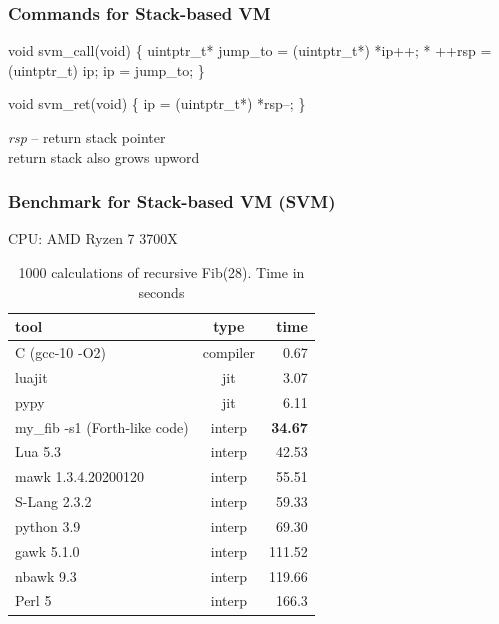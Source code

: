 \documentclass[hyperref={colorlinks=true},xcolor=table]{beamer}
\begin{document}
\begin{frame}[fragile]
  \frametitle{Commands for Stack-based VM}
  \begin{CodeNoLabel}
void svm_call(void) \{
    uintptr_t* jump_to = (uintptr_t*) *ip++;
    * ++rsp = (uintptr_t) ip;
    ip = jump_to;
\}

void svm_ret(void) \{
    ip = (uintptr_t*) *rsp--;
\}
  \end{CodeNoLabel}
  \textit{rsp} -- return stack pointer\\
  return stack also grows upword
\end{frame}

\begin{frame}[fragile]
  \frametitle{Benchmark for Stack-based VM (SVM)}
  CPU: AMD Ryzen 7 3700X\break\break
  \begin{table}
    \begin{tabular}{ | l | c | r | }
      \hline
      \rowcolor{lightgray} tool & type & time \\
      \hline
      C (gcc-10 -O2) & compiler & 0.67 \\
      luajit & jit & 3.07 \\
      pypy & jit & 6.11 \\
      \hline
      my\_fib -s1 (Forth-like code) & interp & \textbf{34.67} \\
      Lua 5.3 & interp & 42.53 \\
      mawk 1.3.4.20200120 & interp & 55.51 \\
      S-Lang 2.3.2 & interp & 59.33 \\
      python 3.9 & interp & 69.30 \\
      gawk 5.1.0 & interp & 111.52 \\
      nbawk 9.3 & interp & 119.66 \\
      Perl 5 & interp & 166.3 \\
      \hline
    \end{tabular}
    \caption{1000 calculations of recursive Fib(28). Time in seconds}
  \end{table}
\end{frame}
\end{document}
